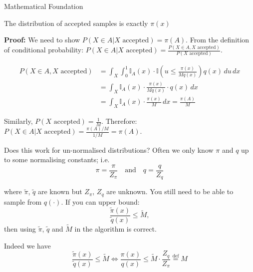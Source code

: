 \begin{frame}{Mathematical Foundation}
	\begin{proposition}
		The distribution of accepted samples is exactly $\pi(x)$
	\end{proposition}
	\textbf{Proof:} We need to show $P(X \in A | X \text{ accepted}) = \pi(A)$. From the
	definition of conditional probability: $P(X \in A | X \text{ accepted}) = \frac{P(X \in A, X \text{ accepted})}{P(X \text{ accepted})}$.

	\begin{align*}
		P(X \in A, X \text{ accepted}) & = \int_X \int_0^1 \mathbb{I}_A(x) \cdot \mathbb{I}\left(u \leq \frac{\pi(x)}{M q(x)}\right) q(x) \, du \, dx \\
		                               & = \int_X \mathbb{I}_A(x) \cdot \frac{\pi(x)}{M q(x)} \cdot q(x) \, dx                                        \\
		                               & = \int_X \mathbb{I}_A(x) \cdot \frac{\pi(x)}{M} \, dx = \frac{\pi(A)}{M}
	\end{align*}

	Similarly, $P(X \text{ accepted}) = \frac{1}{M}$. Therefore: $P(X \in A | X \text{ accepted}) = \frac{\pi(A)/M}{1/M} = \pi(A)$.

\end{frame}

\begin{frame}{Does this work for un-normalised distributions?}
	Often we only know $\pi$ and $q$ up to some normalising constants; i.e.
	\begin{equation*}
		\pi = \frac{\pi}{Z_\pi} \quad \text{and} \quad q = \frac{q}{Z_q}
	\end{equation*}

	where $\tilde{\pi}$, $\tilde{q}$ are known but $Z_\pi$, $Z_q$ are unknown.
	You still need to be able to sample from $q(\cdot)$.
	If you can upper bound:
	\begin{equation*}
		\frac{\tilde{\pi}(x)}{\tilde{q}(x)} \leq \tilde{M},
	\end{equation*}
	then using $\tilde{\pi}$, $\tilde{q}$ and $\tilde{M}$ in the algorithm is correct.


	Indeed we have
	\begin{equation*}
		\frac{\tilde{\pi}(x)} {\tilde{q}(x)} \leq \tilde{M} \iff
		\frac{\pi(x)}{q(x)} \leq \tilde{M} \cdot \frac{Z_q}{Z_\pi} \overset{\text{def}}{=} M
	\end{equation*}

\end{frame}

